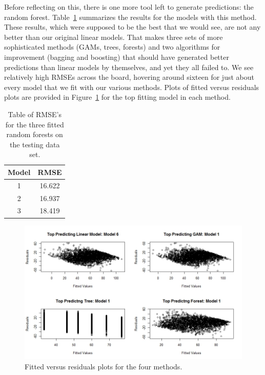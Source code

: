 \documentclass[12pt]{article}\usepackage[]{graphicx}\usepackage[]{color}
\begin{document}
Before reflecting on this, there is one more tool left to generate predictions: the random forest. Table~\ref{tab:forestres} summarizes the results for the models with this method. These results, which were supposed to be the best that we would see, are not any better than our original linear models. That makes three sets of more sophisticated methods (GAMs, trees, forests) and two algorithms for improvement (bagging and boosting) that should have generated better predictions than linear models by themselves, and yet they all failed to. We see relatively high RMSEs across the board, hovering around sixteen for just about every model that we fit with our various methods. Plots of fitted versus residuals plots are provided in Figure~\ref{fig:residbyfit} for the top fitting model in each method.

\begin{table}[h]
\centering
\begin{tabular}{|c|c|}
\hline
Model & RMSE \\
\hline
1 & 16.622\\
\hline
2 & 16.937\\
\hline
3 & 18.419\\
\hline
\end{tabular}
\captionsetup{font=footnotesize,labelfont=footnotesize}
\caption{\label{tab:forestres} Table of RMSE's for the three fitted random forests on the testing data set.}
\end{table}

\begin{figure}[h]
	\centering
	\includegraphics[width=\textwidth]{residbyfit.jpeg}
	\captionsetup{font=footnotesize,labelfont=footnotesize}
	\caption{\label{fig:residbyfit} Fitted versus residuals plots for the four methods.}
\end{figure}
\end{document}
